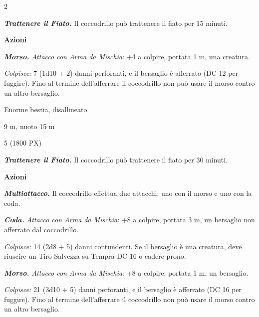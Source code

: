 \begin{multicols}{2}
{\emph{\textbf{Trattenere il Fiato.}} Il coccodrillo può trattenere il fiato per 15 minuti.

\textbf{Azioni}

\emph{\textbf{Morso.} Attacco con Arma da Mischia}: +4 a colpire, portata 1 m, una creatura.

\emph{Colpisce:} 7 (1d10 + 2) danni perforanti, e il bersaglio è afferrato (DC 12 per fuggire). Fino al termine dell'afferrare il coccodrillo non può usare il morso contro un altro bersaglio.

\begin{description}[noitemsep, topsep=0pt, parsep=0pt, partopsep=0pt, itemsep=1pt, leftmargin=2.35cm,  labelwidth=2.2cm, itemindent=0cm, listparindent=0pt] %
\setlength{\baselineskip}{10pt}
\item[\textbf{Taglia/Tipo}] Enorme bestia, disallineato
\item[\textbf{Caratt.}] 
\item[\textbf{Punti Ferita}] 
\item[\textbf{Tiri Salvez.}] 
\item[\textbf{Movimento}] 9 m, nuoto 15 m
\item[\textbf{Sfida}] 5 (1800 PX)
\end{description}
\smallskip

\emph{\textbf{Trattenere il Fiato.}} Il coccodrillo può trattenere il fiato per 30 minuti.

\textbf{Azioni}

\emph{\textbf{Multiattacco.}} Il coccodrillo effettua due attacchi: uno con il morso e uno con la coda.

\emph{\textbf{Coda.} Attacco con Arma da Mischia}: +8 a colpire, portata 3 m, un bersaglio non afferrato dal coccodrillo.

\emph{Colpisce:} 14 (2d8 + 5) danni contundenti. Se il bersaglio è una creatura, deve riuscire un Tiro Salvezza su Tempra DC 16 o cadere prono.

\emph{\textbf{Morso.} Attacco con Arma da Mischia}: +8 a colpire, portata 1 m, un bersaglio.

\emph{Colpisce:} 21 (3d10 + 5) danni perforanti, e il bersaglio è afferrato (DC 16 per fuggire). Fino al termine dell'afferrare il coccodrillo non può usare il morso contro un altro bersaglio.

}
\end{multicols}
